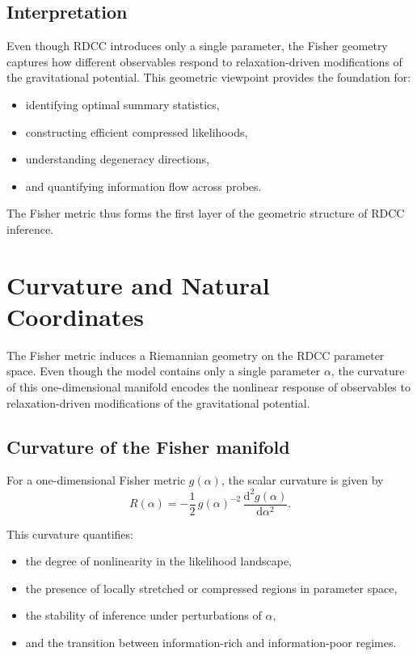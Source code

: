 \documentclass[11pt,a4paper]{article}
\begin{document}
\subsection{Interpretation}

Even though RDCC introduces only a single parameter, the Fisher geometry 
captures how different observables respond to relaxation-driven modifications 
of the gravitational potential. This geometric viewpoint provides the 
foundation for:
\begin{itemize}
    \item identifying optimal summary statistics,
    \item constructing efficient compressed likelihoods,
    \item understanding degeneracy directions,
    \item and quantifying information flow across probes.
\end{itemize}

The Fisher metric thus forms the first layer of the geometric structure of 
RDCC inference.
\section{Curvature and Natural Coordinates}

The Fisher metric induces a Riemannian geometry on the RDCC parameter space. 
Even though the model contains only a single parameter $\alpha$, the curvature 
of this one-dimensional manifold encodes the nonlinear response of observables 
to relaxation-driven modifications of the gravitational potential.

\subsection{Curvature of the Fisher manifold}

For a one-dimensional Fisher metric $g(\alpha)$, the scalar curvature is given by
\begin{equation}
R(\alpha)
=
-\frac{1}{2} \, g(\alpha)^{-2} \,
\frac{\mathrm{d}^2 g(\alpha)}{\mathrm{d}\alpha^2}.
\end{equation}

This curvature quantifies:
\begin{itemize}
    \item the degree of nonlinearity in the likelihood landscape,
    \item the presence of locally stretched or compressed regions in parameter space,
    \item the stability of inference under perturbations of $\alpha$,
    \item and the transition between information-rich and information-poor regimes.
\end{itemize}
\end{document}
